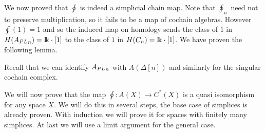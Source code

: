 We now proved that $\oint$ is indeed a simplicial chain map. Note that $\oint_n$ need not to preserve multiplication, so it fails to be a map of cochain algebras. However $\oint(1) = 1$ and so the induced map on homology sends the class of $1$ in $H({A_{PL}}_n) = \mathrm{I\!k} \cdot [1]$ to the class of $1$ in $H(C_n) = \mathrm{I\!k} \cdot [1]$. We have proven the following lemma.


Recall that we can identify ${A_{PL}}_n$ with $A(\Delta[n])$ and similarly for the singular cochain complex.

We will now prove that the map $\oint: A(X) \to C^\ast(X)$ is a quasi isomorphism for any space $X$. We will do this in several steps, the base case of simplices is already proven. With induction we will prove it for spaces with finitely many simplices. At last we will use a limit argument for the general case.

